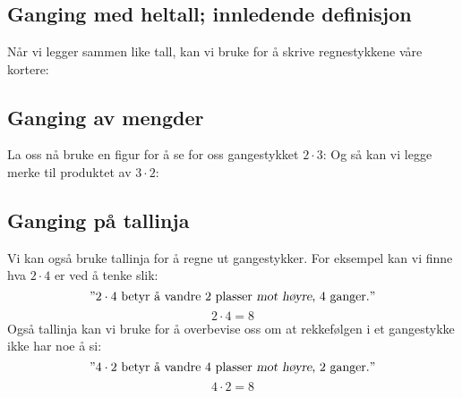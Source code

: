 \section{\gong \label{Gonging} }

\subsection*{Ganging med heltall; innledende definisjon}
Når vi legger sammen like tall, kan vi bruke  \sym{$ \cdot $}\;for å skrive regnestykkene våre kortere: \regv
{} \regv
{}
\subsection*{Ganging av mengder} \label{gangmengd}
La oss nå bruke en figur for å se for oss gangestykket $ 2\cdot3 $:
Og så kan vi legge merke til produktet av $ 3\cdot 2 $:
\reg[\gangkom \label{gangkom}]{
	Produktet er det samme uansett rekkefølge på faktorene.
}

\subsection*{Ganging på tallinja}
Vi kan også bruke tallinja for å regne ut gangestykker. For eksempel kan vi finne hva $ 2\cdot4 $ er ved å tenke slik:
\[\text{''} 2\cdot 4 \text{ betyr å vandre 2 plasser \textsl{mot høyre}, 4 ganger.}\text{''} \]
\[ 2\cdot4=8 \]
Også tallinja kan vi bruke for å overbevise oss om at rekkefølgen i et gangestykke ikke har noe å si:
\[\text{''} 4\cdot 2 \text{ betyr å vandre 4 plasser \textsl{mot høyre}, 2 ganger.}\text{''} \]
\[ 4\cdot2=8 \]

